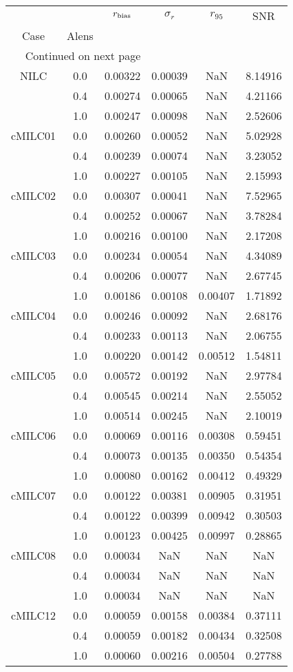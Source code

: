 \begin{longtable}{cccccc}
\toprule
     &     &  $r_{\rm bias}$  &  $\sigma_r$ &  $r_{95}$ &     SNR \\
Case & Alens &                  &             &           &         \\
\midrule
\endhead
\midrule
\multicolumn{3}{r}{{Continued on next page}} \\
\midrule
\endfoot

\bottomrule
\endlastfoot
NILC & 0.0 & 0.00322 & 0.00039 & NaN & 8.14916 \\
     & 0.4 & 0.00274 & 0.00065 & NaN & 4.21166 \\
     & 1.0 & 0.00247 & 0.00098 & NaN & 2.52606 \\
cMILC01 & 0.0 & 0.00260 & 0.00052 & NaN & 5.02928 \\
     & 0.4 & 0.00239 & 0.00074 & NaN & 3.23052 \\
     & 1.0 & 0.00227 & 0.00105 & NaN & 2.15993 \\
cMILC02 & 0.0 & 0.00307 & 0.00041 & NaN & 7.52965 \\
     & 0.4 & 0.00252 & 0.00067 & NaN & 3.78284 \\
     & 1.0 & 0.00216 & 0.00100 & NaN & 2.17208 \\
cMILC03 & 0.0 & 0.00234 & 0.00054 & NaN & 4.34089 \\
     & 0.4 & 0.00206 & 0.00077 & NaN & 2.67745 \\
     & 1.0 & 0.00186 & 0.00108 & 0.00407 & 1.71892 \\
cMILC04 & 0.0 & 0.00246 & 0.00092 & NaN & 2.68176 \\
     & 0.4 & 0.00233 & 0.00113 & NaN & 2.06755 \\
     & 1.0 & 0.00220 & 0.00142 & 0.00512 & 1.54811 \\
cMILC05 & 0.0 & 0.00572 & 0.00192 & NaN & 2.97784 \\
     & 0.4 & 0.00545 & 0.00214 & NaN & 2.55052 \\
     & 1.0 & 0.00514 & 0.00245 & NaN & 2.10019 \\
cMILC06 & 0.0 & 0.00069 & 0.00116 & 0.00308 & 0.59451 \\
     & 0.4 & 0.00073 & 0.00135 & 0.00350 & 0.54354 \\
     & 1.0 & 0.00080 & 0.00162 & 0.00412 & 0.49329 \\
cMILC07 & 0.0 & 0.00122 & 0.00381 & 0.00905 & 0.31951 \\
     & 0.4 & 0.00122 & 0.00399 & 0.00942 & 0.30503 \\
     & 1.0 & 0.00123 & 0.00425 & 0.00997 & 0.28865 \\
cMILC08 & 0.0 & 0.00034 & NaN & NaN & NaN \\
     & 0.4 & 0.00034 & NaN & NaN & NaN \\
     & 1.0 & 0.00034 & NaN & NaN & NaN \\
cMILC12 & 0.0 & 0.00059 & 0.00158 & 0.00384 & 0.37111 \\
     & 0.4 & 0.00059 & 0.00182 & 0.00434 & 0.32508 \\
     & 1.0 & 0.00060 & 0.00216 & 0.00504 & 0.27788 \\
\end{longtable}
